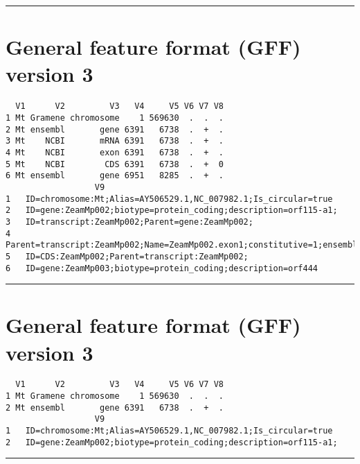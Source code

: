 \documentclass[]{article}
\begin{document}
\begin{center}\rule{0.5\linewidth}{0.5pt}\end{center}

\hypertarget{general-feature-format-gff-version-3}{%
\section{General feature format (GFF) version
3}\label{general-feature-format-gff-version-3}}

\begin{verbatim}
  V1      V2         V3   V4     V5 V6 V7 V8
1 Mt Gramene chromosome    1 569630  .  .  .
2 Mt ensembl       gene 6391   6738  .  +  .
3 Mt    NCBI       mRNA 6391   6738  .  +  .
4 Mt    NCBI       exon 6391   6738  .  +  .
5 Mt    NCBI        CDS 6391   6738  .  +  0
6 Mt ensembl       gene 6951   8285  .  +  .
                  V9
1   ID=chromosome:Mt;Alias=AY506529.1,NC_007982.1;Is_circular=true
2   ID=gene:ZeamMp002;biotype=protein_coding;description=orf115-a1;
3   ID=transcript:ZeamMp002;Parent=gene:ZeamMp002;
4   Parent=transcript:ZeamMp002;Name=ZeamMp002.exon1;constitutive=1;ensembl_end_phase=0;
5   ID=CDS:ZeamMp002;Parent=transcript:ZeamMp002;
6   ID=gene:ZeamMp003;biotype=protein_coding;description=orf444
\end{verbatim}

\begin{center}\rule{0.5\linewidth}{0.5pt}\end{center}

\hypertarget{general-feature-format-gff-version-3-1}{%
\section{General feature format (GFF) version
3}\label{general-feature-format-gff-version-3-1}}

\begin{verbatim}
  V1      V2         V3   V4     V5 V6 V7 V8
1 Mt Gramene chromosome    1 569630  .  .  .
2 Mt ensembl       gene 6391   6738  .  +  .
                  V9
1   ID=chromosome:Mt;Alias=AY506529.1,NC_007982.1;Is_circular=true
2   ID=gene:ZeamMp002;biotype=protein_coding;description=orf115-a1;
\end{verbatim}

\begin{center}\rule{0.5\linewidth}{0.5pt}\end{center}
\end{document}
